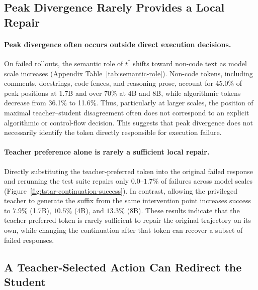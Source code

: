 \subsection{Peak Divergence Rarely Provides a Local Repair}
\label{sec:analysis-findings}

\paragraph{Peak divergence often occurs outside direct execution decisions.}
On failed rollouts, the semantic role of $t^*$ shifts toward non-code text as model scale increases (Appendix Table~\ref{tab:semantic-role}). Non-code tokens, including comments, docstrings, code fences, and reasoning prose, account for 45.0\% of peak positions at 1.7B and over 70\% at 4B and 8B, while algorithmic tokens decrease from 36.1\% to 11.6\%. Thus, particularly at larger scales, the position of maximal teacher--student disagreement often does not correspond to an explicit algorithmic or control-flow decision. This suggests that peak divergence does not necessarily identify the token directly responsible for execution failure.

\vspace{-0.1cm}\paragraph{Teacher preference alone is rarely a sufficient local repair.}
Directly substituting the teacher-preferred token into the original failed response and rerunning the test suite repairs only $0.0$--$1.7\%$ of failures across model scales (Figure~\ref{fig:tstar-continuation-success}). In contrast, allowing the privileged teacher to generate the suffix from the same intervention point increases success to $7.9\%$ (1.7B), $10.5\%$ (4B), and $13.3\%$ (8B). These results indicate that the teacher-preferred token is rarely sufficient to repair the original trajectory on its own, while changing the continuation after that token can recover a subset of failed responses.

\subsection{A Teacher-Selected Action Can Redirect the Student}
\label{sec:analysis-steering}


